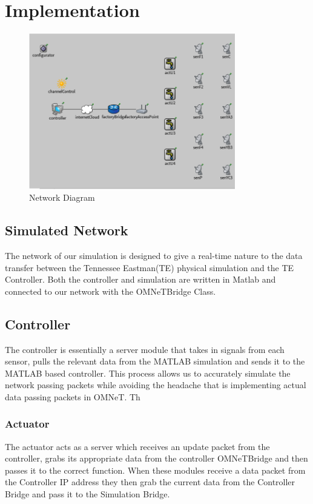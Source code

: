 \section{Implementation}

\begin{figure}[ht!]
        \centering
		\includegraphics[width=90mm]{figs/network.png}
        \caption{Network Diagram}
        \label{fig:network}        
\end{figure}

\subsection{Simulated Network}

The network of our simulation is designed to give a real-time nature to the data transfer between the Tennessee Eastman(TE) physical simulation and the TE Controller. Both the controller and simulation are written in Matlab and connected to our network with the OMNeTBridge Class. 


\subsection{Controller}

The controller is essentially a server module that takes in signals from each sensor, pulls the relevant data from the MATLAB simulation and sends it to the MATLAB based controller. This process allows us to accurately simulate the network passing packets while avoiding the headache that is implementing actual data passing packets in OMNeT. Th


\subsubsection{Actuator}

The actuator acts as a server which receives an update packet from the controller, grabs its 
appropriate data from the controller OMNeTBridge and then passes it to the correct function. 
When these modules receive a data packet from the Controller IP address they then grab the current data from the Controller Bridge and pass it to the Simulation Bridge. 

